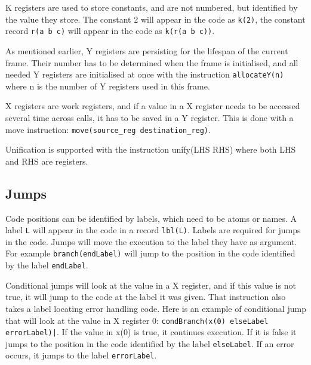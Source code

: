 \documentclass[a4paper]{memoir}
\begin{document}
K registers are used to store constants, and are not numbered, but identified by
the value they store. The constant 2 will appear in the code as
\lstinline!k(2)!, the constant record \lstinline!r(a b c)! will appear in the
code as \lstinline!k(r(a b c))!.

As mentioned earlier, Y registers are persisting for the lifespan of the current frame. Their number has to be determined when the frame is initialised, and all needed Y registers are initialised at once with the instruction \lstinline!allocateY(n)! where n is the number of Y registers used in this frame.

X registers are work registers, and if a value in a X register needs to be accessed several time across calls, it has to be saved in a Y register. This is done with a move instruction: \lstinline!move(source_reg destination_reg)!.

Unification is supported with the instruction unify(LHS RHS) where both LHS and RHS are registers.

\subsection{Jumps}\label{sec:opcode:jumps}
Code positions can be identified by labels, which need to be atoms or names. A label \lstinline!L! will appear in the code in a record \lstinline!lbl(L)!. 
Labels are required for jumps in the code. 
Jumps will move the execution to the label they have as argument. For example \lstinline!branch(endLabel)! will jump to the position in the code identified by the label \lstinline!endLabel!.

Conditional jumps will look at the value in a X register, and if this value is not true, it will jump to the code at the label it was given. That instruction also takes a label locating error handling code. Here is an example of conditional jump that will look at the value in X register 0: \lstinline!condBranch(x(0) elseLabel errorLabel)|!. If the value in x(0) is true, it continues execution. If it is false it jumps to the position in the code identified by the label \lstinline!elseLabel!. If an error occurs, it jumps to the label \lstinline!errorLabel!.
\end{document}

